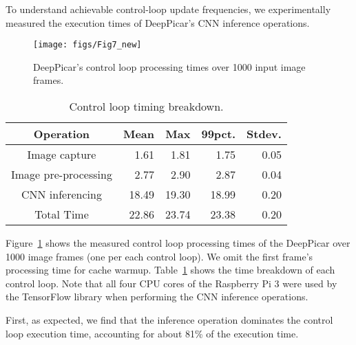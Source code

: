To understand achievable control-loop update frequencies, we
experimentally measured the execution times of DeepPicar's CNN
inference operations.


\begin{figure}[h]
  \centering
  \texttt{[image: figs/Fig7\_new]}
  \caption{DeepPicar's control loop processing times over 1000 input image frames.}
  \label{fig:control-loop-timing}
\end{figure}

\begin{table}[h]
  \centering
  \begin{tabular} {| c | r | r | r | r |}
    \hline
    \textbf{Operation} & \textbf{Mean} & \textbf{Max} &   \textbf{99pct.} & \textbf{Stdev.} \\ \hline
    Image capture        & 1.61  &  1.81 &  1.75  & 0.05 \\ \hline
    Image pre-processing & 2.77  &  2.90 &  2.87  & 0.04 \\ \hline
    CNN inferencing      & 18.49 & 19.30 & 18.99  & 0.20 \\ \hline
    Total Time           & 22.86 & 23.74 & 23.38  & 0.20 \\ \hline
  \end{tabular}
  \caption{Control loop timing breakdown.}
  \label{tbl:control-loop-breakdown}
\end{table}

Figure~\ref{fig:control-loop-timing} shows the measured control loop
processing times of the DeepPicar over 1000 image frames (one per each
control loop). We omit the first frame's processing time for cache
warmup. Table~\ref{tbl:control-loop-breakdown} shows the time
breakdown of each control loop. Note that all four CPU cores of the
Raspberry Pi 3 were used by the TensorFlow library when performing the
CNN inference operations.

First, as expected, we find that the inference operation
dominates the control loop execution time, accounting for about 81\% of
the execution time.

